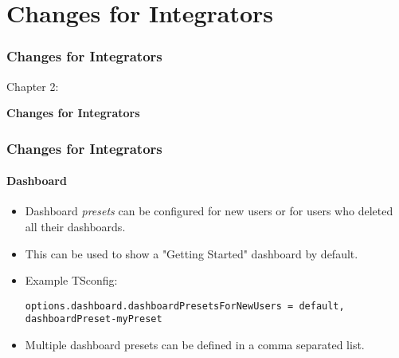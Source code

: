 %

\section{Changes for Integrators}
\begin{frame}[fragile]
	\frametitle{Changes for Integrators}

	\begin{center}\huge{Chapter 2:}\end{center}
	\begin{center}\huge{\color{typo3darkgrey}\textbf{Changes for Integrators}}\end{center}

\end{frame}


\begin{frame}[fragile]
	\frametitle{Changes for Integrators}
	\framesubtitle{Dashboard}

	\lstset{basicstyle=\tiny\ttfamily}

	\begin{itemize}
		\item Dashboard \textit{presets} can be configured for new users or for users who deleted all their dashboards.
		\item This can be used to show a "Getting Started" dashboard by default.
		\item Example TSconfig:

\vspace{-0.4cm}
\begin{lstlisting}
options.dashboard.dashboardPresetsForNewUsers = default, dashboardPreset-myPreset
\end{lstlisting}

		\item Multiple dashboard presets can be defined in a comma separated list.

	\end{itemize}

\end{frame}

